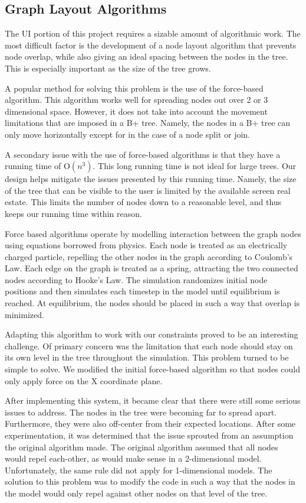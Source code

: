 \subsection{Graph Layout Algorithms}
The UI portion of this project requires a sizable amount of
algorithmic work. The most difficult factor is the development of a
node layout algorithm that prevents node overlap, while also giving an
ideal spacing between the nodes in the tree. This is especially
important as the size of the tree grows.

A popular method for solving this problem is the use of the
force-based algorithm. This algorithm works well for spreading nodes
out over 2 or 3 dimensional space. However, it does not take into
account the movement limitations that are imposed in a B+
tree. Namely, the nodes in a B+ tree can only move horizontally except
for in the case of a node split or join.

A secondary issue with the use of force-based algorithms is that they
have a running time of O$(n^3)$. This long running time is not ideal
for large trees. Our design helps mitigate the issues presented by
this running time. Namely, the size of the tree that can be visible to
the user is limited by the available screen real estate. This limits
the number of nodes down to a reasonable level, and thus keeps our
running time within reason.

Force based algorithms operate by modelling interaction between the
graph nodes using equations borrowed from physics. Each node is
treated as an electrically charged particle, repelling the other nodes
in the graph according to Coulomb's Law. Each edge on the graph is
treated as a spring, attracting the two connected nodes according to
Hooke's Law. The simulation randomizes initial node positions and then
simulates each timestep in the model until equilibrium is reached. At
equilibrium, the nodes should be placed in such a way that overlap is
minimized.

Adapting this algorithm to work with our constraints proved to be an
interesting challenge. Of primary concern was the limitation that each
node should stay on its own level in the tree throughout the
simulation. This problem turned to be simple to solve. We modified the
initial force-based algorithm so that nodes could only apply force on
the X coordinate plane.

After implementing this system, it became clear that there were still
some serious issues to address. The nodes in the tree were becoming
far to spread apart. Furthermore, they were also off-center from their
expected locations. After some experimentation, it was determined that
the issue sprouted from an assumption the original algorithm made. The
original algorithm assumed that all nodes would repel each-other, as
would make sense in a 2-dimensional model. Unfortunately, the same
rule did not apply for 1-dimensional models. The solution to this
problem was to modify the code in such a way that the nodes in the
model would only repel against other nodes on that level of the tree.


